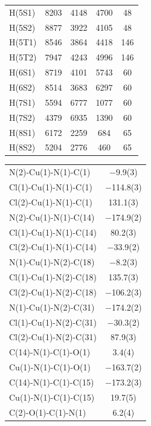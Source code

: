 \begin{center}
{\begin{supertabular}{lcccc}
H(5S1)&8203&4148&4700&48\\
H(5S2)&8877&3922&4105&48\\
H(5T1)&8546&3864&4418&146\\
H(5T2)&7947&4243&4996&146\\
H(6S1)&8719&4101&5743&60\\
H(6S2)&8514&3683&6297&60\\
H(7S1)&5594&6777&1077&60\\
H(7S2)&4379&6935&1390&60\\
H(8S1)&6172&2259&684&65\\
H(8S2)&5204&2776&460&65\\
\end{supertabular}
}
\end{center}

\begin{center}
\tablefirsthead{%
\toprule}
\tablelasttail{\bottomrule}
{\footnotesize \singlespacing
\begin{supertabular}{p{1.8in}c}
N(2)-Cu(1)-N(1)-C(1)&$-$9.9(3)\\
Cl(1)-Cu(1)-N(1)-C(1)&$-$114.8(3)\\
Cl(2)-Cu(1)-N(1)-C(1)&131.1(3)\\
N(2)-Cu(1)-N(1)-C(14)&$-$174.9(2)\\
Cl(1)-Cu(1)-N(1)-C(14)&80.2(3)\\
Cl(2)-Cu(1)-N(1)-C(14)&$-$33.9(2)\\
N(1)-Cu(1)-N(2)-C(18)&$-$8.2(3)\\
Cl(1)-Cu(1)-N(2)-C(18)&135.7(3)\\
Cl(2)-Cu(1)-N(2)-C(18)&$-$106.2(3)\\
N(1)-Cu(1)-N(2)-C(31)&$-$174.2(2)\\
Cl(1)-Cu(1)-N(2)-C(31)&$-$30.3(2)\\
Cl(2)-Cu(1)-N(2)-C(31)&87.9(3)\\
C(14)-N(1)-C(1)-O(1)&3.4(4)\\
Cu(1)-N(1)-C(1)-O(1)&$-$163.7(2)\\
C(14)-N(1)-C(1)-C(15)&$-$173.2(3)\\
Cu(1)-N(1)-C(1)-C(15)&19.7(5)\\
C(2)-O(1)-C(1)-N(1)&6.2(4)\\

\end{supertabular}}
\end{center}
